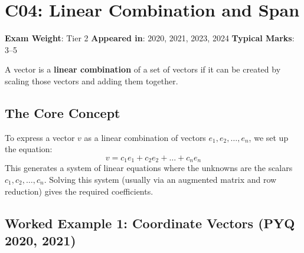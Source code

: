 \documentclass[
]{article}
\renewenvironment{quote}
  {\begin{tcolorbox}[
     colback=calloutbg,
     colframe=calloutframe,
     colupper=callouttext,
     arc=3pt,
     boxrule=0.5pt,
     leftrule=0.5pt,
     borderline west={3pt}{0pt}{calloutaccent},
     left=8pt,
     right=8pt,
     top=6pt,
     bottom=6pt
   ]}
  {\end{tcolorbox}}
\begin{document}
\section{C04: Linear Combination and
Span}\label{c04-linear-combination-and-span}

\begin{quote}
\textbf{Exam Weight}: Tier 2 \textbar{} \textbf{Appeared in}: 2020,
2021, 2023, 2024 \textbar{} \textbf{Typical Marks}: 3--5
\end{quote}

A vector is a \textbf{linear combination} of a set of vectors if it can
be created by scaling those vectors and adding them together.

\subsection{The Core Concept}\label{the-core-concept}

To express a vector \(v\) as a linear combination of vectors
\(e_1, e_2, \dots, e_n\), we set up the equation:
\[
v = c_1 e_1 + c_2 e_2 + \dots + c_n e_n
\]
This generates a system of linear equations where the unknowns are the
scalars \(c_1, c_2, \dots, c_n\). Solving this system (usually via an
augmented matrix and row reduction) gives the required coefficients.

\subsection{Worked Example 1: Coordinate Vectors (PYQ 2020,
2021)}\label{worked-example-1-coordinate-vectors-pyq-2020-2021}
\end{document}
